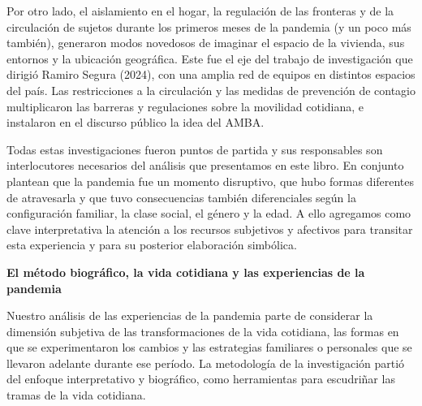Por otro lado, el aislamiento en el hogar, la regulación de las fronteras y de la circulación de sujetos durante los primeros meses de la pandemia (y un poco más también), generaron modos novedosos de imaginar el espacio de la vivienda, sus entornos y la ubicación geográfica. Este fue el eje del trabajo de investigación que dirigió Ramiro Segura (2024), con una amplia red de equipos en distintos espacios del país. Las restricciones a la circulación y las medidas de prevención de contagio multiplicaron las barreras y regulaciones sobre la movilidad cotidiana, e instalaron en el discurso público la idea del AMBA.

Todas estas investigaciones fueron puntos de partida y sus responsables son interlocutores necesarios del análisis que presentamos en este libro. En conjunto plantean que la pandemia fue un momento disruptivo, que hubo formas diferentes de atravesarla y que tuvo consecuencias también diferenciales según la configuración familiar, la clase social, el género y la edad. A ello agregamos como clave interpretativa la atención a los recursos subjetivos y afectivos para transitar esta experiencia y para su posterior elaboración simbólica.

\textbf{El método biográfico, la vida cotidiana y las experiencias de la pandemia}

Nuestro análisis de las experiencias de la pandemia parte de considerar la dimensión subjetiva de las transformaciones de la vida cotidiana, las formas en que se experimentaron los cambios y las estrategias familiares o personales que se llevaron adelante durante ese período. La metodología de la investigación partió del enfoque interpretativo y biográfico, como herramientas para escudriñar las tramas de la vida cotidiana.

